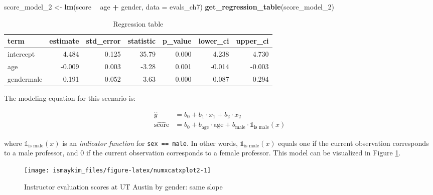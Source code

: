 \documentclass[12pt,]{krantz}
\makeatletter
\newenvironment{Shaded}{\begin{snugshade}}{\end{snugshade}}
\newcommand{\KeywordTok}[1]{\textcolor[rgb]{0.27,0.27,0.27}{\textbf{#1}}}
\newcommand{\DataTypeTok}[1]{\textcolor[rgb]{0.27,0.27,0.27}{#1}}
\newcommand{\DecValTok}[1]{\textcolor[rgb]{0.06,0.06,0.06}{#1}}
\newcommand{\StringTok}[1]{\textcolor[rgb]{0.5,0.5,0.5}{#1}}
\newcommand{\OperatorTok}[1]{\textcolor[rgb]{0.43,0.43,0.43}{\textbf{#1}}}
\newcommand{\NormalTok}[1]{#1}
\newenvironment{kframe}{%
\medskip{}
\setlength{\fboxsep}{.8em}
 \def\at@end@of@kframe{}%
 \ifinner\ifhmode%
  \def\at@end@of@kframe{\end{minipage}}%
  \begin{minipage}{\columnwidth}%
 \fi\fi%
 \def\FrameCommand##1{\hskip\@totalleftmargin \hskip-\fboxsep
 \colorbox{shadecolor}{##1}\hskip-\fboxsep
     \hskip-\linewidth \hskip-\@totalleftmargin \hskip\columnwidth}%
 \MakeFramed {\advance\hsize-\width
   \@totalleftmargin\z@ \linewidth\hsize
   \@setminipage}}%
 {\par\unskip\endMakeFramed%
 \at@end@of@kframe}
\renewenvironment{Shaded}{\begin{kframe}}{\end{kframe}}
\theoremstyle{definition}
\theoremstyle{definition}
\theoremstyle{definition}
\theoremstyle{remark}
\makeatother
\begin{document}
\begin{Shaded}
\begin{Highlighting}[]
\NormalTok{score_model_}\DecValTok{2}\NormalTok{ <-}\StringTok{ }\KeywordTok{lm}\NormalTok{(score }\OperatorTok{~}\StringTok{ }\NormalTok{age }\OperatorTok{+}\StringTok{ }\NormalTok{gender, }\DataTypeTok{data =}\NormalTok{ evals_ch7)}
\KeywordTok{get_regression_table}\NormalTok{(score_model_}\DecValTok{2}\NormalTok{)}
\end{Highlighting}
\end{Shaded}

\begin{table}[H]

\caption{\label{tab:unnamed-chunk-251}Regression table}
\centering
\fontsize{10}{12}\selectfont
\begin{tabular}[t]{lrrrrrr}
\toprule
term & estimate & std\_error & statistic & p\_value & lower\_ci & upper\_ci\\
\midrule
intercept & 4.484 & 0.125 & 35.79 & 0.000 & 4.238 & 4.730\\
age & -0.009 & 0.003 & -3.28 & 0.001 & -0.014 & -0.003\\
gendermale & 0.191 & 0.052 & 3.63 & 0.000 & 0.087 & 0.294\\
\bottomrule
\end{tabular}
\end{table}

The modeling equation for this scenario is:

\begin{align}
\widehat{y} &= b_0 + b_1 \cdot x_1 + b_2 \cdot x_2 \\
\widehat{\mbox{score}} &= b_0 + b_{\mbox{age}} \cdot \mbox{age} + b_{\mbox{male}} \cdot \mathbb{1}_{\mbox{is male}}(x)
\end{align}

where \(\mathbb{1}_{\mbox{is male}}(x)\) is an \emph{indicator function}
for \texttt{sex\ ==\ male}. In other words,
\(\mathbb{1}_{\mbox{is male}}(x)\) equals one if the current observation
corresponds to a male professor, and 0 if the current observation
corresponds to a female professor. This model can be visualized in
Figure \ref{fig:numxcatxplot2}.

\begin{figure}

{\centering \texttt{[image: ismaykim\_files/figure-latex/numxcatxplot2-1]} 

}

\caption{Instructor evaluation scores at UT Austin by gender: same slope}\label{fig:numxcatxplot2}
\end{figure}
\end{document}
